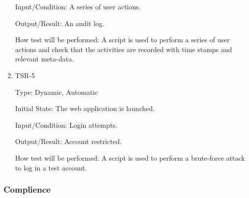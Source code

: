 \documentclass[12pt, titlepage]{article}
\begin{document}
\begin{enumerate}
Input/Condition: A series of user actions.
					
Output/Result: An audit log.
					
How test will be performed: A script is used to perform a series of user actions and check that the activities are recorded with time stamps and relevant meta-data.

\item{TSR-5\\}\label{TSR-5}

Type: Dynamic, Automatic
					
Initial State: The web application is launched.
					
Input/Condition: Login attempts.
					
Output/Result: Account restricted.
					
How test will be performed: A script is used to perform a brute-force attack to log in a test account.
\end{enumerate}

\subsubsection{Complience}
\end{document}
